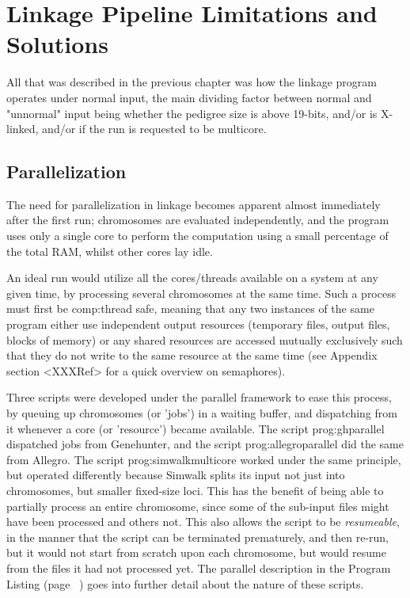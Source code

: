 \section{Linkage Pipeline Limitations and Solutions}

All that was described in the previous chapter was how the linkage program operates under normal input, the main dividing factor between normal and "unnormal" input being whether the pedigree size is above 19-bits, and/or is X-linked, and/or if the run is requested to be multicore.

\subsection{Parallelization}

The need for parallelization in linkage becomes apparent almost immediately after the first run; chromosomes are evaluated independently, and the program uses only a single core to perform the computation using a small percentage of the total RAM, whilst other cores lay idle.

An ideal run would utilize all the cores/threads available on a system at any given time, by processing several chromosomes at the same time.  Such a process must first be \gls{comp:thread safe}, meaning that any two instances of the same program either use independent output resources (temporary files, output files, blocks of memory) or any shared resources are accessed mutually exclusively such that they do not write to the same resource at the same time (see Appendix section <XXXRef> for a quick overview on semaphores).

Three scripts were developed under the parallel framework to ease this process, by queuing up chromosomes (or 'jobs') in a waiting buffer, and dispatching from it whenever a core (or 'resource') became available. The script \gls{prog:ghparallel} dispatched jobs from Genehunter, and the script \gls{prog:allegroparallel} did the same from Allegro. The script \gls{prog:simwalkmulticore} worked under the same principle, but operated differently because Simwalk splits its input not just into chromosomes, but smaller fixed-size loci. This has the benefit of being able to partially process an entire chromosome, since some of the sub-input files might have been  processed and others not. This also allows the script to be \textit{resumeable}, in the manner that the script can be terminated prematurely, and then re-run, but it would not start from scratch upon each chromosome, but would resume from the files it had not processed yet. The parallel description in the Program Listing (page ~\pageref{ref:meth:proglist}) goes into further detail about the nature of these scripts.


